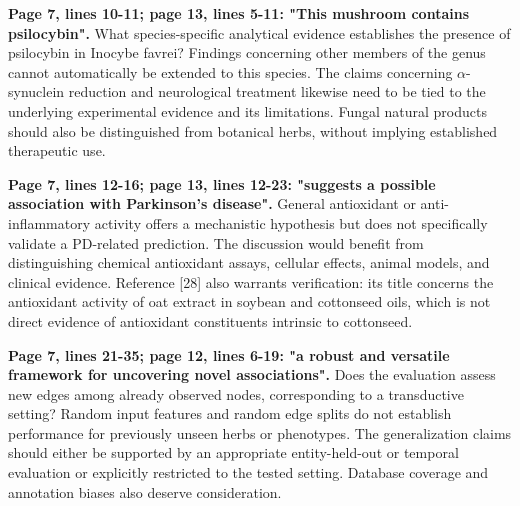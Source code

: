 \documentclass[11pt,american]{article}
\begin{document}
\begin{revresponse}

\end{revresponse}

\begin{revcomment}
\textbf{Page 7, lines 10-11; page 13, lines 5-11: "This mushroom contains psilocybin".} What species-specific analytical evidence establishes the presence of psilocybin in Inocybe favrei? Findings concerning other members of the genus cannot automatically be extended to this species. The claims concerning $\alpha$-synuclein reduction and neurological treatment likewise need to be tied to the underlying experimental evidence and its limitations. Fungal natural products should also be distinguished from botanical herbs, without implying established therapeutic use.
\end{revcomment}

\begin{revresponse}

\end{revresponse}

\begin{revcomment}
\textbf{Page 7, lines 12-16; page 13, lines 12-23: "suggests a possible association with Parkinson's disease".} General antioxidant or anti-inflammatory activity offers a mechanistic hypothesis but does not specifically validate a PD-related prediction. The discussion would benefit from distinguishing chemical antioxidant assays, cellular effects, animal models, and clinical evidence. Reference [28] also warrants verification: its title concerns the antioxidant activity of oat extract in soybean and cottonseed oils, which is not direct evidence of antioxidant constituents intrinsic to cottonseed.
\end{revcomment}

\begin{revresponse}

\end{revresponse}

\begin{revcomment}
\textbf{Page 7, lines 21-35; page 12, lines 6-19: "a robust and versatile framework for uncovering novel associations".} Does the evaluation assess new edges among already observed nodes, corresponding to a transductive setting? Random input features and random edge splits do not establish performance for previously unseen herbs or phenotypes. The generalization claims should either be supported by an appropriate entity-held-out or temporal evaluation or explicitly restricted to the tested setting. Database coverage and annotation biases also deserve consideration.
\end{revcomment}
\end{document}
